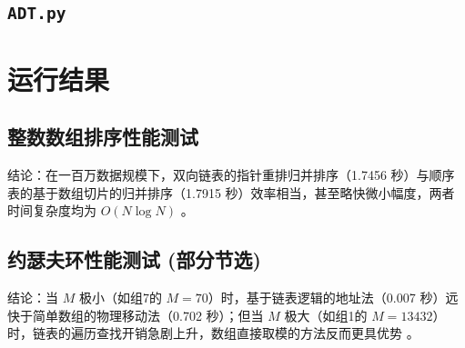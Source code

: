 \documentclass[12pt,a4paper]{ctexart}
\begin{document}
	\subsection{\texttt{ADT.py}}
	
	
	\section{运行结果}
	\subsection{整数数组排序性能测试}
	
	\noindent 结论：在一百万数据规模下，双向链表的指针重排归并排序（1.7456 秒）与顺序表的基于数组切片的归并排序（1.7915 秒）效率相当，甚至略快微小幅度，两者时间复杂度均为 $O(N \log N)$ 。
	
	\subsection{约瑟夫环性能测试 (部分节选)}
 	
	\noindent 结论：当 $M$ 极小（如组7的 $M=70$）时，基于链表逻辑的地址法（0.007 秒）远快于简单数组的物理移动法（0.702 秒）；但当 $M$ 极大（如组1的 $M=13432$）时，链表的遍历查找开销急剧上升，数组直接取模的方法反而更具优势 。
	
\end{document}
